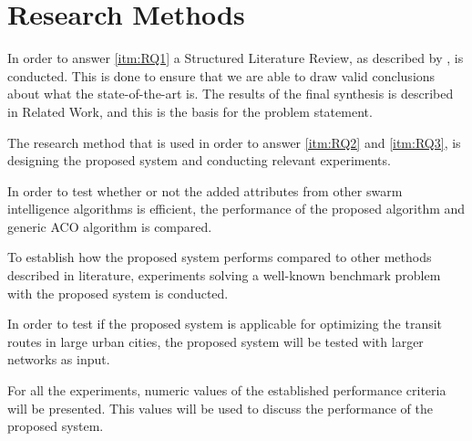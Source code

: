 \section{Research Methods}


In order to answer \vref{itm:RQ1} a Structured Literature Review, as described by \citep{kofod2014}, is conducted. This is done to ensure that we are able to draw valid conclusions about what the state-of-the-art is. The results of the final synthesis is described in Related Work, and this is the basis for the problem statement.

The research method that is used in order to answer \vref{itm:RQ2} and \vref{itm:RQ3}, is designing the proposed system and conducting relevant experiments. 

In order to test whether or not the added attributes from other swarm intelligence algorithms is efficient, the performance of the proposed algorithm and generic ACO algorithm is compared. 

To establish how the proposed system performs compared to other methods described in literature, experiments solving a well-known benchmark problem with the proposed system is conducted. 

In order to test if the proposed system is applicable for optimizing the transit routes in large urban cities, the proposed system will be tested with larger networks as input. 

For all the experiments, numeric values of the established performance criteria will be presented. This values will be used to discuss the performance of the proposed system. 
